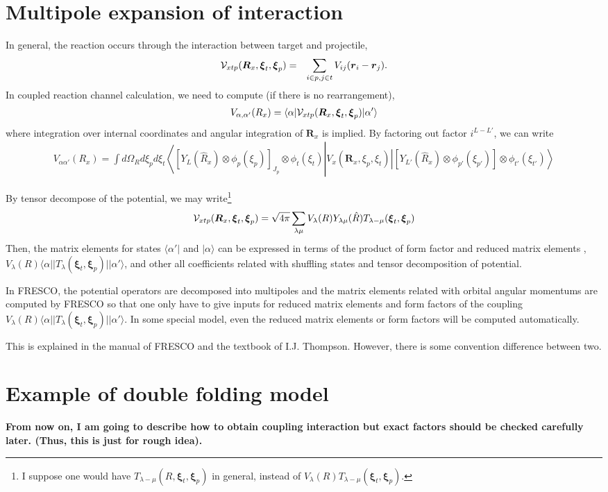 \documentclass[11pt]{book}
\def\bm{\boldsymbol}
\def\vr{{\bm r}}
\def\la{\langle}
\def\ra{\rangle}
\newcommand{\bea}{\begin{eqnarray}}
\newcommand{\eea}{\end{eqnarray}}
\begin{document}
\section{Multipole expansion of interaction}
In general, the reaction occurs through the interaction between target and projectile,
\bea 
{\cal V}_{xtp}({\bm R}_x,{\bm \xi}_t,{\bm \xi}_p)&=&\sum_{i\in p, j\in t} V_{ij}(\vr_i-\vr_j).
\eea 
In coupled reaction channel calculation, we need to compute (if there is no rearrangement), 
\bea 
V_{\alpha,\alpha'}(R_x)=\la \alpha| {\cal V}_{xtp}({\bm R}_x,{\bm \xi}_t,{\bm \xi}_p)|\alpha'\ra 
\eea 
where integration over internal coordinates and angular integration of ${\bm R}_x$
is implied. 
By factoring out factor $i^{L-L'}$, we can write 
\bea 
V_{\alpha\alpha'}(R_x)=\int d\Omega_{R} d\xi_p d\xi_t 
\left \la [Y_L(\hat{R}_x)\otimes \phi_p(\xi_p)]_{J_p}\otimes \phi_t(\xi_t)\right|
V_x({\bm R}_x,\xi_p,\xi_t)\left| 
[Y_{L'}(\hat{R}_{x})\otimes \phi_{p'}(\xi_{p'})]\otimes \phi_{t'}(\xi_{t'})\right\ra 
\eea 

By tensor decompose of the potential, we may write\footnote{I suppose
one would have $T_{\lambda -\mu}(R,{\bm \xi}_t,{\bm \xi}_p)$ in general,
instead of  $V_\lambda(R)T_{\lambda -\mu}({\bm \xi}_t,{\bm \xi}_p)$.
 }
\bea 
{\cal V}_{xtp}({\bm R}_x,{\bm \xi}_t,{\bm \xi}_p)
=\sqrt{4\pi} \sum_{\lambda\mu} V_\lambda(R) Y_{\lambda\mu}(\hat{R}) T_{\lambda -\mu}({\bm \xi}_t,{\bm \xi}_p)
\eea 
Then, the matrix elements for states $\la \alpha'|$ and $|\alpha\ra$
can be expressed in terms of the product of form factor and reduced matrix elements
, $V_\lambda(R)\la \alpha||T_{\lambda}({\bm \xi}_t,{\bm \xi}_p)||\alpha'\ra $, and 
other all coefficients related with shuffling states and tensor decomposition of  
potential. 

In FRESCO, 
the potential operators are decomposed into multipoles and the matrix elements related with
orbital angular momentums are computed by FRESCO so that one only have to give inputs for 
reduced matrix elements and form factors of the coupling $V_\lambda(R)\la \alpha||T_{\lambda}({\bm \xi}_t,{\bm \xi}_p)||\alpha'\ra $. In some special model, even the reduced matrix elements or
form factors will be computed automatically.   

This is explained in the manual of FRESCO and the textbook of I.J. Thompson.
However, there is some convention difference between two. 



\section{Example of double folding model}
{\bf From now on, I am going to describe how to obtain coupling interaction 
but exact factors should be checked carefully later. (Thus, this is just for rough idea).}
\end{document}

